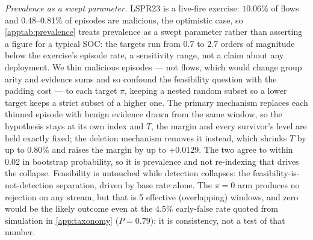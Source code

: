 \emph{Prevalence as a swept parameter.} LSPR23 is a live-fire exercise: $10.06\%$ of flows and
0.48--0.81\% of episodes are
malicious, the optimistic case, so \cref{apptab:prevalence} treats prevalence as a swept parameter rather
than asserting a figure for a typical SOC: the targets run from 0.7 to 2.7 orders of
magnitude below the exercise's episode rate, a sensitivity range, not a claim about any deployment. We thin malicious
episodes --- not flows, which would change group arity and evidence sums and so confound the
feasibility question with the padding cost --- to each target $\pi$, keeping a nested random subset so
a lower target keeps a strict subset of a higher one. The primary mechanism replaces each thinned
episode with benign evidence drawn from the same window, so the hypothesis stays at its own index and
$T$, the margin and every survivor's level are held exactly fixed; the deletion mechanism removes it
instead, which shrinks $T$ by up to 0.80\% and raises the margin by up to
+0.0129. The two agree to within 0.02 in
bootstrap probability, so it is prevalence and not re-indexing that drives the collapse. Feasibility is
untouched while detection collapses: the feasibility-is-not-detection separation, driven by base rate
alone. The $\pi=0$ arm produces no rejection on any stream, but that is 5
effective (overlapping) windows, and zero would be the likely outcome even at the $4.5\%$ early-false
rate quoted from simulation in \cref{app:taxonomy} ($P=0.79$): it is
consistency, not a test of that number.
